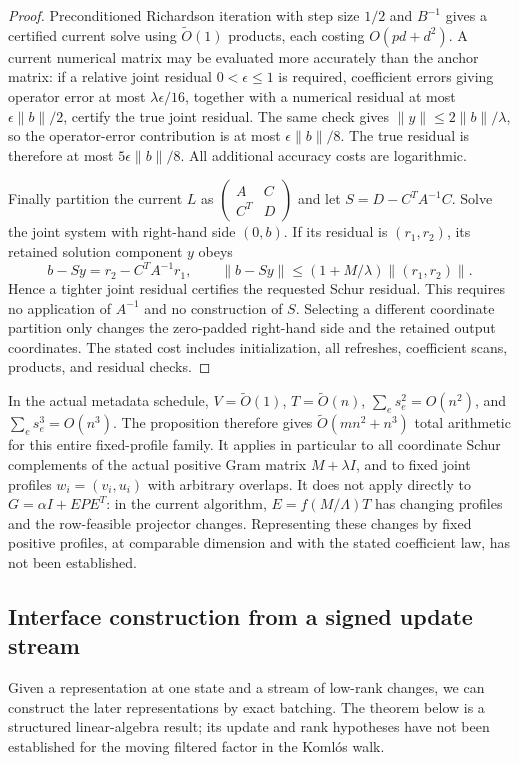 \documentclass[11pt]{amsart}
\theoremstyle{definition}\newtheorem{definition}[theorem]{Definition}
\theoremstyle{remark}\newtheorem{remark}[theorem]{Remark}
\numberwithin{equation}{section}
\begin{document}
\begin{proof}
Preconditioned Richardson iteration with step size $1/2$ and $B^{-1}$ gives a certified
current solve using $\widetilde O(1)$ products, each costing
$O(pd+d^2)$. A current numerical matrix may be evaluated more accurately
than the anchor matrix: if a relative joint residual $0<\epsilon\le1$ is
required, coefficient errors giving operator error at most
$\lambda\epsilon/16$, together with a numerical residual at most
$\epsilon\|b\|/2$, certify the true joint residual. The same check gives
$\|y\|\le 2\|b\|/\lambda$, so the operator-error contribution is at most
$\epsilon\|b\|/8$. The true residual is therefore at most
$5\epsilon\|b\|/8$.
All additional accuracy costs are logarithmic.

Finally partition the current $L$ as
$\left(\begin{smallmatrix}A&C\\C^T&D\end{smallmatrix}\right)$ and
let $S=D-C^TA^{-1}C$. Solve the joint system with right-hand side
$(0,b)$. If its residual is $(r_1,r_2)$, its retained solution component
$y$ obeys
\[
 b-Sy=r_2-C^TA^{-1}r_1,\qquad
 \|b-Sy\|\le(1+M/\lambda)\|(r_1,r_2)\|.
\]
Hence a tighter joint residual certifies the requested Schur residual.
This requires no application of $A^{-1}$ and no construction of $S$.
Selecting a different coordinate partition only changes the zero-padded
right-hand side and the retained output coordinates. The stated cost
includes initialization, all refreshes, coefficient scans, products,
and residual checks.
\end{proof}

In the actual metadata schedule, $V=\widetilde O(1)$,
$T=\widetilde O(n)$, $\sum_e s_e^2=O(n^2)$, and
$\sum_e s_e^3=O(n^3)$. The proposition therefore gives
$\widetilde O(mn^2+n^3)$ total arithmetic for this entire fixed-profile
family. It applies in particular to all coordinate Schur complements
of the actual positive Gram matrix $M+\lambda I$, and to fixed joint
profiles $w_i=(v_i,u_i)$ with arbitrary overlaps. It does not apply
directly to $G=\alpha I+EPE^T$: in the current algorithm,
$E=f(M/\Lambda)T$ has changing profiles and the row-feasible projector changes.
Representing these changes by fixed positive profiles, at comparable
dimension and with the stated coefficient law, has not been established.

\subsection{Interface construction from a signed update stream}
Given a representation at one state and a stream of low-rank changes,
we can construct the later representations by exact batching. The theorem
below is a structured linear-algebra result; its update and rank
hypotheses have not been established for the moving filtered factor in
the Koml\'os walk.
\end{document}

